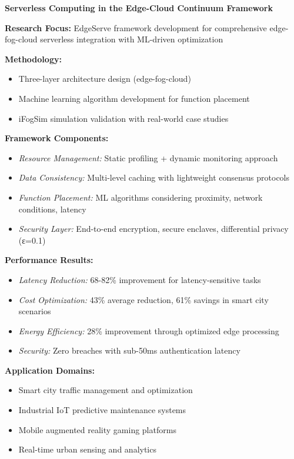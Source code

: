 \vspace{1em}

\noindent
\begin{minipage}{\textwidth}
\textbf{\large Serverless Computing in the Edge-Cloud Continuum Framework} \cite{belcastro2023edge}

\textbf{Research Focus:} EdgeServe framework development for comprehensive edge-fog-cloud serverless integration with ML-driven optimization

\textbf{Methodology:}
\begin{itemize}
    \item Three-layer architecture design (edge-fog-cloud)
    \item Machine learning algorithm development for function placement
    \item iFogSim simulation validation with real-world case studies
\end{itemize}

\textbf{Framework Components:}
\begin{itemize}
    \item \textit{Resource Management:} Static profiling + dynamic monitoring approach
    \item \textit{Data Consistency:} Multi-level caching with lightweight consensus protocols
    \item \textit{Function Placement:} ML algorithms considering proximity, network conditions, latency
    \item \textit{Security Layer:} End-to-end encryption, secure enclaves, differential privacy (ε=0.1)
\end{itemize}

\textbf{Performance Results:}
\begin{itemize}
    \item \textit{Latency Reduction:} 68-82\% improvement for latency-sensitive tasks
    \item \textit{Cost Optimization:} 43\% average reduction, 61\% savings in smart city scenarios
    \item \textit{Energy Efficiency:} 28\% improvement through optimized edge processing
    \item \textit{Security:} Zero breaches with sub-50ms authentication latency
\end{itemize}

\textbf{Application Domains:}
\begin{itemize}
    \item Smart city traffic management and optimization
    \item Industrial IoT predictive maintenance systems
    \item Mobile augmented reality gaming platforms
    \item Real-time urban sensing and analytics
\end{itemize}
\end{minipage}

